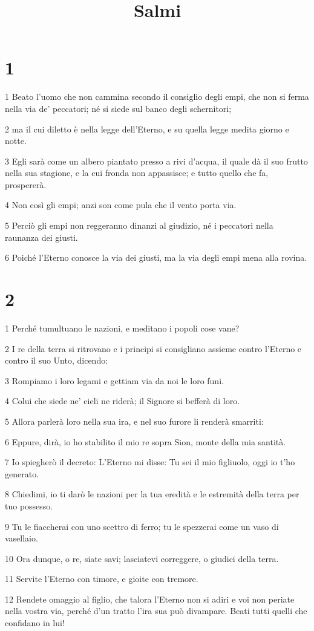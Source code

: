 

\title{Salmi}


\chapter{1}

\par 1 Beato l'uomo che non cammina secondo il consiglio degli empi, che non si ferma nella via de' peccatori; né si siede sul banco degli schernitori;
\par 2 ma il cui diletto è nella legge dell'Eterno, e su quella legge medita giorno e notte.
\par 3 Egli sarà come un albero piantato presso a rivi d'acqua, il quale dà il suo frutto nella sua stagione, e la cui fronda non appassisce; e tutto quello che fa, prospererà.
\par 4 Non così gli empi; anzi son come pula che il vento porta via.
\par 5 Perciò gli empi non reggeranno dinanzi al giudizio, né i peccatori nella raunanza dei giusti.
\par 6 Poiché l'Eterno conosce la via dei giusti, ma la via degli empi mena alla rovina.

\chapter{2}

\par 1 Perché tumultuano le nazioni, e meditano i popoli cose vane?
\par 2 I re della terra si ritrovano e i principi si consigliano assieme contro l'Eterno e contro il suo Unto, dicendo:
\par 3 Rompiamo i loro legami e gettiam via da noi le loro funi.
\par 4 Colui che siede ne' cieli ne riderà; il Signore si befferà di loro.
\par 5 Allora parlerà loro nella sua ira, e nel suo furore li renderà smarriti:
\par 6 Eppure, dirà, io ho stabilito il mio re sopra Sion, monte della mia santità.
\par 7 Io spiegherò il decreto: L'Eterno mi disse: Tu sei il mio figliuolo, oggi io t'ho generato.
\par 8 Chiedimi, io ti darò le nazioni per la tua eredità e le estremità della terra per tuo possesso.
\par 9 Tu le fiaccherai con uno scettro di ferro; tu le spezzerai come un vaso di vasellaio.
\par 10 Ora dunque, o re, siate savi; lasciatevi correggere, o giudici della terra.
\par 11 Servite l'Eterno con timore, e gioite con tremore.
\par 12 Rendete omaggio al figlio, che talora l'Eterno non si adiri e voi non periate nella vostra via, perché d'un tratto l'ira sua può divampare. Beati tutti quelli che confidano in lui!

